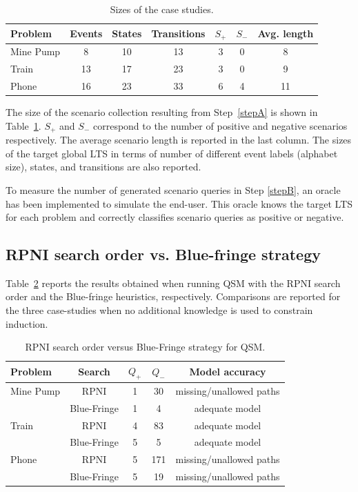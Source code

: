 \begin{table}[H]
\centering
\begin{tabular}{|l||c|c|c||c|c|c|}\hline
Problem  & Events & States & Transitions & $S_+$ & $S_-$ & Avg. length\\\hline\hline
Mine Pump& 8      & 10     & 13          & 3     & 0     & 8\\\hline
Train    & 13     & 17     & 23          & 3     & 0     & 9\\\hline
Phone    & 16     & 23     & 33          & 6     & 4     & 11\\\hline
\end{tabular}
\caption{Sizes of the case studies.\label{CaseStudies}}
\end{table} 

The size of the scenario collection resulting from Step~\ref{stepA} is shown in Table~\ref{CaseStudies}. $S_+$ and $S_-$ correspond to the number of positive and negative scenarios respectively. The average scenario length is reported in the last column. The sizes of the target global LTS in terms of number of different event labels (alphabet size), states, and transitions are also reported. 

To measure the number of generated scenario queries in Step \ref{stepB}, an oracle has been implemented to simulate the end-user. This oracle knows the target LTS for each problem and correctly classifies scenario queries as positive or negative.


\subsection{RPNI search order vs. Blue-fringe strategy\label{subsection:evaluation-bluefringe-on-casestudies}}

Table~\ref{RPNI:Blue-fringe} reports the results obtained when running QSM with the RPNI search order and the Blue-fringe heuristics, respectively. Comparisons are reported for the three case-studies when no additional knowledge is used to constrain induction. 

\begin{table}[H]
\centering
\begin{tabular}{|l||c||c|c|c|}\hline
Problem   & Search      &$Q_+$&$Q_-$& Model accuracy\\\hline\hline
Mine Pump & RPNI        & 1   & 30  & missing/unallowed paths\\\cline{2-5}
          & Blue-Fringe & 1   & 4   & adequate model\\\hline
Train     & RPNI        & 4   & 83  & adequate model\\\cline{2-5}
          & Blue-Fringe & 5   & 5   & adequate model\\\hline
Phone     & RPNI        & 5   & 171 & missing/unallowed paths\\\cline{2-5}
          & Blue-Fringe & 5   & 19  & missing/unallowed paths\\\hline
\end{tabular}
\caption{RPNI search order versus Blue-Fringe strategy for QSM.\label{RPNI:Blue-fringe}}
\end{table}

